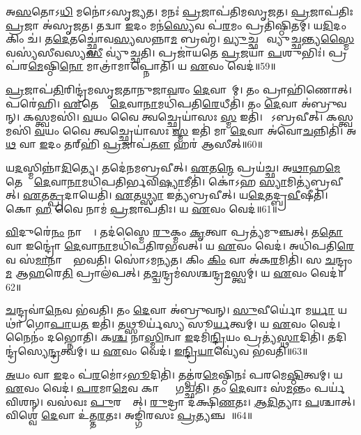 𑌅\ul{𑌸}𑌤𑍋𑌽\ul{𑌧𑌿} 𑌮𑌨𑍋॑\-𑌽𑌸𑍃𑌜𑍍𑌯𑌤।
𑌮𑌨𑌃॑ \ul{𑌪𑍍𑌰}𑌜𑌾𑌪॑𑌤𑌿𑌮𑌸𑍃𑌜𑌤।
\ul{𑌪𑍍𑌰}𑌜𑌾𑌪॑𑌤𑌿𑌃 \ul{𑌪𑍍𑌰}𑌜𑌾 𑌅॑𑌸𑍃𑌜𑌤।
𑌤𑌦𑍍𑌵𑌾 \ul{𑌇}𑌦𑌂 𑌮𑌨॑\ul{𑌸𑍍𑌯𑍇}𑌵 𑌪॑\ul{𑌰}𑌮𑌂 𑌪𑍍𑌰𑌤𑌿॑\-𑌷𑍍𑌠𑌿𑌤𑌮𑍍।
𑌯\ul{𑌦𑌿}𑌦𑌂 𑌕𑌿𑌂 𑌚॑।
𑌤\ul{𑌦𑍇}𑌤𑌚𑍍𑌛𑍍𑌵𑍋॑𑌵\ul{𑌸𑍍𑌯}𑌸𑌨𑍍𑌨𑌾\ul{𑌮} 𑌬𑍍𑌰𑌹𑍍𑌮॑।
\ul{𑌵𑍍𑌯𑍁}𑌚𑍍𑌛𑌨𑍍𑌤𑍀᳚𑌵𑍍𑌯𑍁𑌚𑍍𑌛𑌨𑍍𑌤𑍍𑌯\ul{𑌸𑍍𑌮𑍈} 𑌵𑌸𑍍𑌯॑𑌸𑍀𑌵𑌸𑍍𑌯\ul{𑌸𑍀} 𑌵𑍍𑌯𑍁॑𑌚𑍍𑌛𑌤𑌿।
𑌪𑍍𑌰𑌜𑌾॑𑌯𑌤𑍇 \ul{𑌪𑍍𑌰}𑌜𑌯𑌾॑ \ul{𑌪}𑌶𑍁𑌭𑌿𑌃॑।
𑌪𑍍𑌰 𑌪॑𑌰\ul{𑌮𑍇}𑌷𑍍𑌠𑌿\ul{𑌨𑍋} 𑌮𑌾𑌤𑍍𑌰𑌾॑𑌮𑌾𑌪𑍍𑌨𑍋𑌤𑌿।
𑌯 \ul{𑌏}𑌵𑌂 𑌵𑍇𑌦॑॥59॥

\ul{𑌪𑍍𑌰}𑌜𑌾𑌪॑\ul{𑌤𑌿}𑌰𑌿𑌨𑍍𑌦𑍍𑌰॑𑌮𑌸𑍃𑌜𑌤𑌾𑌨𑍁𑌜𑌾\ul{𑌵}𑌰𑌂 \ul{𑌦𑍇}𑌵𑌾𑌨𑌾᳚𑌮𑍍।
𑌤𑌂 𑌪𑍍𑌰𑌾𑌹𑌿॑𑌣𑍋𑌤𑍍।
𑌪𑌰𑍇॑𑌹𑌿।
\ul{𑌏}𑌤𑍇𑌷𑌾𑌂᳚ \ul{𑌦𑍇}𑌵𑌾\ul{𑌨𑌾}𑌮𑌧𑌿॑𑌪𑌤𑌿\ul{𑌰𑍇}𑌧𑍀𑌤𑌿॑।
𑌤𑌂 \ul{𑌦𑍇}𑌵𑌾 𑌅॑𑌬𑍍𑌰𑍁𑌵𑌨𑍍।
𑌕𑌸𑍍𑌤𑍍𑌵𑌮𑌸𑌿॑।
\ul{𑌵}𑌯𑌂 𑌵𑍈 𑌤𑍍𑌵𑌚𑍍𑌛𑍍𑌰𑍇𑌯𑌾॑𑌸𑌃 \ul{𑌸𑍍𑌮} 𑌇𑌤𑌿॑।
𑌸𑍋᳚𑌽𑌬𑍍𑌰𑌵𑍀𑌤𑍍।
𑌕𑌸𑍍𑌤𑍍𑌵𑌮𑌸𑌿॑ \ul{𑌵}𑌯𑌂 𑌵𑍈 𑌤𑍍𑌵𑌚𑍍𑌛𑍍𑌰𑍇𑌯𑌾॑𑌸𑌃 \ul{𑌸𑍍𑌮} 𑌇𑌤𑌿॑ 𑌮𑌾 \ul{𑌦𑍇}𑌵𑌾 𑌅॑𑌵𑍋\ul{𑌚}𑌨𑍍𑌨𑌿𑌤𑌿॑।
𑌅\ul{𑌥} 𑌵𑌾 \ul{𑌇}𑌦𑌂 𑌤𑌰𑍍‌\mbox{}𑌹𑌿॑ \ul{𑌪𑍍𑌰}𑌜𑌾𑌪॑\ul{𑌤𑍗} 𑌹𑌰॑ 𑌆𑌸𑍀𑌤𑍍॥60॥

𑌯\ul{𑌦}𑌸𑍍𑌮𑌿𑌨𑍍𑌨𑌾॑\ul{𑌦𑌿}𑌤𑍍𑌯𑍇।
𑌤𑌦𑍇॑𑌨𑌮𑌬𑍍𑌰𑌵𑍀𑌤𑍍।
\ul{𑌏}𑌤\ul{𑌨𑍍𑌮𑍇} 𑌪𑍍𑌰𑌯॑𑌚𑍍𑌛।
𑌅\ul{𑌥𑌾}𑌹\ul{𑌮𑍇}𑌤𑍇𑌷𑌾𑌂᳚ \ul{𑌦𑍇}𑌵𑌾\ul{𑌨𑌾}𑌮𑌧𑌿॑𑌪𑌤𑌿𑌰𑍍𑌭𑌵𑌿\ul{𑌷𑍍𑌯𑌾}𑌮𑍀𑌤𑌿॑।
𑌕𑍋॑𑌽𑌹 \ul{𑌸𑍍𑌯𑌾}𑌮𑌿𑌤𑍍𑌯॑𑌬𑍍𑌰𑌵𑍀𑌤𑍍।
\ul{𑌏}𑌤\ul{𑌤𑍍𑌪𑍍𑌰}𑌦𑌾𑌯𑍇𑌤𑌿॑।
\ul{𑌏}𑌤\ul{𑌥𑍍𑌸𑍍𑌯𑌾} 𑌇𑌤𑍍𑌯॑𑌬𑍍𑌰𑌵𑍀𑌤𑍍।
𑌯\ul{𑌦𑍇}𑌤𑌦𑍍𑌬𑍍𑌰\ul{𑌵𑍀}𑌷𑍀𑌤𑌿॑।
𑌕𑍋 \ul{𑌹} 𑌵𑍈 𑌨𑌾𑌮॑ \ul{𑌪𑍍𑌰}𑌜𑌾𑌪॑𑌤𑌿𑌃।
𑌯 \ul{𑌏}𑌵𑌂 𑌵𑍇𑌦॑॥61॥

\ul{𑌵𑌿}𑌦𑍁𑌰𑍇॑\ul{𑌨𑌂} 𑌨𑌾𑌮𑍍𑌨𑌾᳚।
𑌤𑌦॑𑌸𑍍𑌮𑍈 \ul{𑌰𑍁}𑌕𑍍𑌮𑌂 \ul{𑌕𑍃}𑌤𑍍𑌵𑌾 𑌪𑍍𑌰𑌤𑍍𑌯॑𑌮𑍁𑌞𑍍𑌚𑌤𑍍।
𑌤\ul{𑌤𑍋} 𑌵𑌾 𑌇𑌨𑍍𑌦𑍍𑌰𑍋॑ \ul{𑌦𑍇}𑌵𑌾\ul{𑌨𑌾}𑌮𑌧𑌿॑𑌪𑌤𑌿𑌰𑌭𑌵𑌤𑍍।
𑌯 \ul{𑌏}𑌵𑌂 𑌵𑍇𑌦॑।
𑌅𑌧𑌿॑𑌪𑌤𑌿\ul{𑌰𑍇}𑌵 𑌸॑\ul{𑌮𑌾}𑌨𑌾𑌨𑌾𑌂᳚ 𑌭𑌵𑌤𑌿।
𑌸𑍋॑𑌽𑌮𑌨𑍍𑌯𑌤।
𑌕𑌿𑌂 \ul{𑌕𑌿𑌂} 𑌵𑌾 𑌅॑𑌕\ul{𑌰}𑌮𑌿𑌤𑌿॑।
𑌸 \ul{𑌚}𑌨𑍍𑌦𑍍𑌰𑌂 \ul{𑌮} 𑌆\ul{𑌹}𑌰𑍇\ul{𑌤𑌿} 𑌪𑍍𑌰𑌾𑌲॑𑌪𑌤𑍍।
𑌤\ul{𑌚𑍍𑌚}𑌨𑍍𑌦𑍍𑌰𑌮॑𑌸𑌶𑍍𑌚𑌨𑍍𑌦𑍍𑌰\ul{𑌮}𑌸𑍍𑌤𑍍𑌵𑌮𑍍।
𑌯 \ul{𑌏}𑌵𑌂 𑌵𑍇𑌦॑॥62॥

\ul{𑌚}𑌨𑍍𑌦𑍍𑌰𑌵𑌾॑\ul{𑌨𑍇}𑌵 𑌭॑𑌵𑌤𑌿।
𑌤𑌂 \ul{𑌦𑍇}𑌵𑌾 𑌅॑𑌬𑍍𑌰𑍁𑌵𑌨𑍍।
\ul{𑌸𑍁}𑌵𑍀𑌰𑍍𑌯𑍋॑ 𑌮\ul{𑌰𑍍𑌯𑌾} 𑌯𑌥𑌾॑ 𑌗𑍋\ul{𑌪𑌾}𑌯\ul{𑌤} 𑌇𑌤𑌿॑।
𑌤𑌥𑍍𑌸𑍂𑌰𑍍𑌯॑𑌸𑍍𑌯 𑌸𑍂\ul{𑌰𑍍𑌯}𑌤𑍍𑌵𑌮𑍍।
𑌯 \ul{𑌏}𑌵𑌂 𑌵𑍇𑌦॑।
𑌨𑍈𑌨𑌂॑ 𑌦𑌭𑍍𑌨𑍋𑌤𑌿।
𑌕\ul{𑌶𑍍𑌚} 𑌨𑌾\ul{𑌸𑍍𑌮𑌿}𑌨𑍍𑌵𑌾 \ul{𑌇}𑌦𑌮𑌿॑\ul{𑌨𑍍𑌦𑍍𑌰𑌿}𑌯𑌂 𑌪𑍍𑌰𑌤𑍍𑌯॑\ul{𑌸𑍍𑌥𑌾}𑌦𑌿𑌤𑌿॑।
𑌤𑌦𑌿𑌨𑍍𑌦𑍍𑌰॑𑌸𑍍𑌯𑍇\ul{𑌨𑍍𑌦𑍍𑌰}𑌤𑍍𑌵𑌮𑍍।
𑌯 \ul{𑌏}𑌵𑌂 𑌵𑍇𑌦॑।
\ul{𑌇}\ul{𑌨𑍍𑌦𑍍𑌰𑌿}\ul{𑌯𑌾}𑌵𑍍𑌯𑍇॑𑌵 𑌭॑𑌵𑌤𑌿॥63॥

\ul{𑌅}𑌯𑌂 𑌵𑌾 \ul{𑌇}𑌦𑌂 𑌪॑\ul{𑌰}𑌮𑍋॑\-𑌽\ul{𑌭𑍂}𑌦𑌿𑌤𑌿॑।
𑌤𑌤𑍍𑌪॑𑌰\ul{𑌮𑍇}𑌷𑍍𑌠𑌿𑌨𑌃॑ 𑌪𑌰𑌮𑍇\ul{𑌷𑍍𑌠𑌿}𑌤𑍍𑌵𑌮𑍍।
𑌯 \ul{𑌏}𑌵𑌂 𑌵𑍇𑌦॑।
\ul{𑌪}\ul{𑌰}𑌮𑌾\ul{𑌮𑍇}𑌵 𑌕𑌾𑌷𑍍𑌠𑌾𑌂᳚ 𑌗𑌚𑍍𑌛𑌤𑌿।
𑌤𑌂 \ul{𑌦𑍇}𑌵𑌾𑌃 𑌸॑\ul{𑌮}𑌨𑍍𑌤𑌂 𑌪𑌰𑍍𑌯॑𑌵𑌿𑌶𑌨𑍍।
𑌵𑌸॑𑌵𑌃 \ul{𑌪𑍁}𑌰𑌸𑍍𑌤𑌾᳚𑌤𑍍।
\ul{𑌰𑍁}𑌦𑍍𑌰𑌾 𑌦॑𑌕𑍍𑌷𑌿\ul{𑌣}𑌤𑌃।
\ul{𑌆}\ul{𑌦𑌿}𑌤𑍍𑌯𑌾𑌃 \ul{𑌪}𑌶𑍍𑌚𑌾𑌤𑍍।
𑌵𑌿𑌶𑍍𑌵𑍇॑ \ul{𑌦𑍇}𑌵𑌾 𑌉॑𑌤𑍍𑌤\ul{𑌰}𑌤𑌃।
𑌅𑌙𑍍𑌗𑌿॑𑌰𑌸𑌃 \ul{𑌪𑍍𑌰}𑌤𑍍𑌯𑌞𑍍𑌚𑌮𑍍᳚॥64॥

